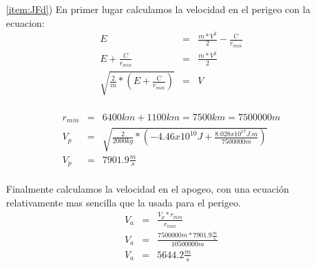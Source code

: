 \documentclass[12pt]{article}
\begin{document}
\begin{enumerate}
\begin{itemize}
  
\item[\ref{item:JFd})] 
En primer lugar calculamos la velocidad en el perigeo con la ecuacion:\\

\begin{eqnarray}
E&=&\frac{m*V^2}{2}-\frac{C}{r_{min}}\nonumber\\
E+\frac{C}{r_{min}}&=&\frac{m*V^2}{2}\nonumber\\
\sqrt{\frac{2}{m}*(E+\frac{C}{r_{min}})}&=&V\\
\nonumber
\end{eqnarray}

\begin{eqnarray}
 r_{min}&=&6400 km + 1100 km = 7500 km = 7500000 m\nonumber\\ 
 V_p&=&\sqrt{\frac{2}{2000 kg}*(-4.46x10^{10} J + \frac{8.028x10^{17} J.m}{7500000 m})}\nonumber\\
 V_p&=&7901.9 \frac{m}{s}\\
 \nonumber
\end{eqnarray}

Finalmente calculamos la velocidad en el apogeo, con una ecuación relativamente mas sencilla que la usada para el perigeo.\\
\begin{eqnarray}
V_a&=&\frac{V_p*r_{min}}{r_{max}}\nonumber\\
V_a&=&\frac{7500000 m * 7901.9 \frac{m}{s}}{10500000 m}\nonumber\\
V_a&=&5644.2 \frac{m}{s}\\
\nonumber
\end{eqnarray}
 
\end{itemize}

\end{enumerate}
\end{document}
